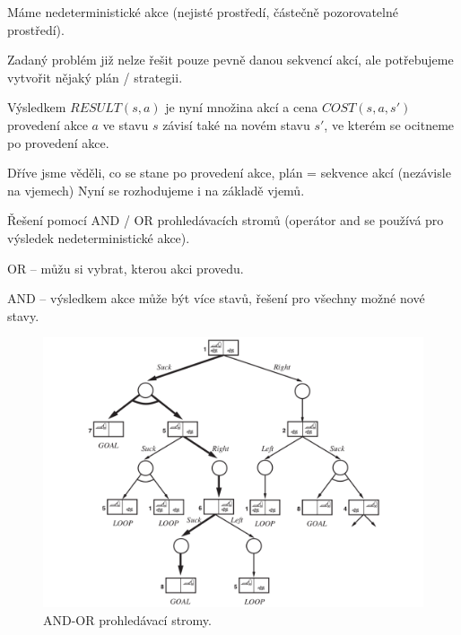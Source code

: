 \begin{compactitem}
    \item Máme nedeterministické akce (nejisté prostředí, částečně pozorovatelné prostředí).

    \item Zadaný problém již nelze řešit pouze pevně danou sekvencí akcí, ale potřebujeme vytvořit nějaký plán / strategii.

    \item Výsledkem $RESULT(s, a)$ je nyní množina akcí a
    cena $COST(s, a, s')$ provedení akce $a$ ve stavu $s$ závisí také na novém stavu $s'$, ve kterém se ocitneme po provedení akce.

    \item Dříve jsme věděli, co se stane po provedení akce, plán = sekvence akcí (nezávisle na vjemech) Nyní se rozhodujeme i na základě vjemů.

    \item Řešení pomocí AND / OR prohledávacích stromů (operátor and se používá pro výsledek nedeterministické akce). \begin{compactitem}
        \item OR -- můžu si vybrat, kterou akci provedu.
        \item AND -- výsledkem akce může být více stavů, řešení pro všechny možné nové stavy.
    \end{compactitem}

    \begin{figure}[H]
        \centering
        \includegraphics[width=1\linewidth]{and_or_prohledavaci_stromy.png}
        \caption{AND-OR prohledávací stromy.}
    \end{figure}


\end{compactitem}
